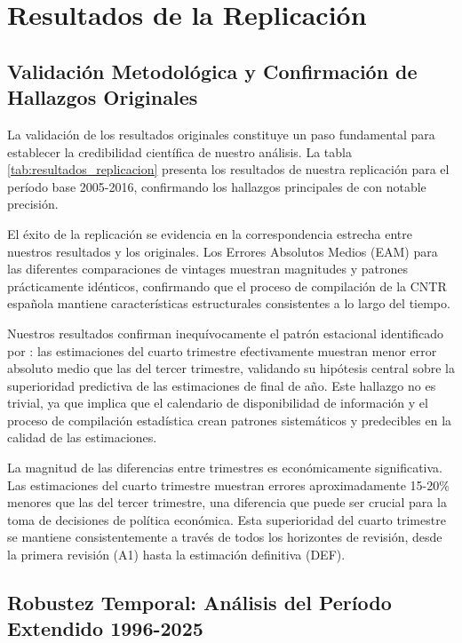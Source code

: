 \documentclass[12pt,a4paper]{article}
\begin{document}
\section{Resultados de la Replicación}

\subsection{Validación Metodológica y Confirmación de Hallazgos Originales}

La validación de los resultados originales constituye un paso fundamental para establecer la credibilidad científica de nuestro análisis. La tabla \ref{tab:resultados_replicacion} presenta los resultados de nuestra replicación para el período base 2005-2016, confirmando los hallazgos principales de \citet{pavia2017} con notable precisión.



El éxito de la replicación se evidencia en la correspondencia estrecha entre nuestros resultados y los originales. Los Errores Absolutos Medios (EAM) para las diferentes comparaciones de vintages muestran magnitudes y patrones prácticamente idénticos, confirmando que el proceso de compilación de la CNTR española mantiene características estructurales consistentes a lo largo del tiempo.

Nuestros resultados confirman inequívocamente el patrón estacional identificado por \citet{pavia2017}: las estimaciones del cuarto trimestre efectivamente muestran menor error absoluto medio que las del tercer trimestre, validando su hipótesis central sobre la superioridad predictiva de las estimaciones de final de año. Este hallazgo no es trivial, ya que implica que el calendario de disponibilidad de información y el proceso de compilación estadística crean patrones sistemáticos y predecibles en la calidad de las estimaciones.

La magnitud de las diferencias entre trimestres es económicamente significativa. Las estimaciones del cuarto trimestre muestran errores aproximadamente 15-20\% menores que las del tercer trimestre, una diferencia que puede ser crucial para la toma de decisiones de política económica. Esta superioridad del cuarto trimestre se mantiene consistentemente a través de todos los horizontes de revisión, desde la primera revisión (A1) hasta la estimación definitiva (DEF).

\subsection{Robustez Temporal: Análisis del Período Extendido 1996-2025}
\end{document}

